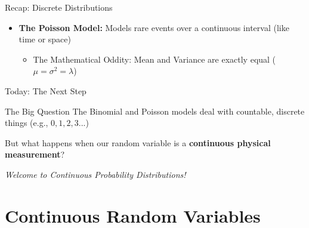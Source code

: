 {\begin{frame}[label=RecapDiscreteDistributions]{Recap: Discrete Distributions}
\begin{itemize}
        \vspace{0.2cm}
        \item \textbf{The Poisson Model:} Models rare events over a continuous interval (like time or space)
        \begin{itemize}
            \item The Mathematical Oddity: Mean and Variance are exactly equal ($\mu = \sigma^2 = \lambda$)
        \end{itemize}
    \end{itemize}
\end{frame}

\begin{frame}{Today: The Next Step}
    \begin{block}{The Big Question}
        The Binomial and Poisson models deal with countable, discrete things (e.g., $0, 1, 2, 3...$)
        
        \vspace{0.2cm}
        But what happens when our random variable is a \textbf{continuous physical measurement}? 
    \end{block}
    
    \vspace{0.5cm}
    \begin{center}
        \Large \textit{Welcome to Continuous Probability Distributions!}
    \end{center}
\end{frame}

}

\section{Continuous Random Variables}

